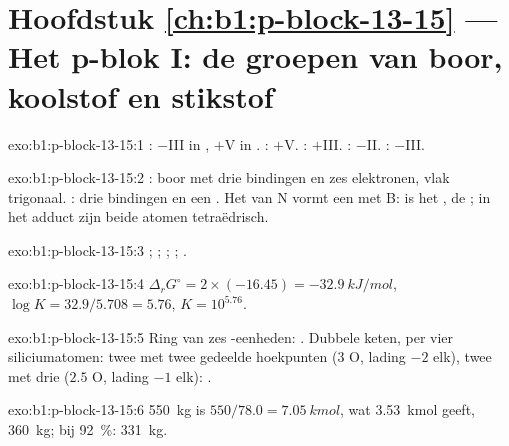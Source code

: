 \section*{Hoofdstuk \ref{ch:b1:p-block-13-15} --- Het p-blok I: de groepen van boor, koolstof en stikstof}

\begin{solution}{exo:b1:p-block-13-15:1}
: $-$III in , $+$V in . : $+$V.
: $+$III. : $-$II. : $-$III.
\end{solution}

\begin{solution}{exo:b1:p-block-13-15:2}
: boor met drie bindingen en zes elektronen, vlak trigonaal.
: drie bindingen en een . Het  van N vormt een
 met B:  is het ,  de ;
in het adduct zijn beide atomen tetraëdrisch.
\end{solution}

\begin{solution}{exo:b1:p-block-13-15:3}
; ;
; ;
.
\end{solution}

\begin{solution}{exo:b1:p-block-13-15:4}
$\Delta_r G^\circ = 2 \times (-16.45) = \qty{-32.9}{kJ/mol}$, $\log K =
32.9/5.708 = 5.76$, $K = 10^{5.76}$.
\end{solution}

\begin{solution}{exo:b1:p-block-13-15:5}
Ring van zes -eenheden: . Dubbele keten, per
vier siliciumatomen: twee met twee gedeelde hoekpunten (3 O, lading $-2$
elk), twee met drie ($2.5$ O, lading $-1$ elk): .
\end{solution}

\begin{solution}{exo:b1:p-block-13-15:6}
\qty{550}{kg}  is $550/78.0 = \qty{7.05}{kmol}$, wat
\qty{3.53}{kmol}  geeft, \qty{360}{kg}; bij \qty{92}{\percent}:
\qty{331}{kg}.
\end{solution}

